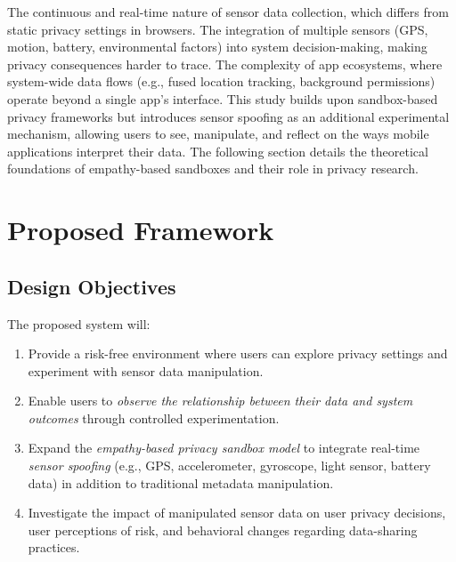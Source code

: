 \documentclass[acmlarge, nonacm]{acmart}
\begin{document}
The continuous and real-time nature of sensor data collection, which differs from static privacy settings in browsers.
The integration of multiple sensors (GPS, motion, battery, environmental factors) into system decision-making, making privacy consequences harder to trace.
The complexity of app ecosystems, where system-wide data flows (e.g., fused location tracking, background permissions) operate beyond a single app’s interface.
This study builds upon sandbox-based privacy frameworks but introduces sensor spoofing as an additional experimental mechanism, allowing users to see, manipulate, and reflect on the ways mobile applications interpret their data. The following section details the theoretical foundations of empathy-based sandboxes and their role in privacy research.



\section{Proposed Framework}

\subsection{Design Objectives}
The proposed system will:
\begin{enumerate}
    \item Provide a risk-free environment where users can explore privacy settings and experiment with sensor data manipulation.
    \item Enable users to \textit{observe the relationship between their data and system outcomes} through controlled experimentation.
    \item Expand the \textit{empathy-based privacy sandbox model} to integrate real-time \textit{sensor spoofing} (e.g., GPS, accelerometer, gyroscope, light sensor, battery data) in addition to traditional metadata manipulation.
    \item Investigate the impact of manipulated sensor data on user privacy decisions, user perceptions of risk, and behavioral changes regarding data-sharing practices.
\end{enumerate}
\end{document}

